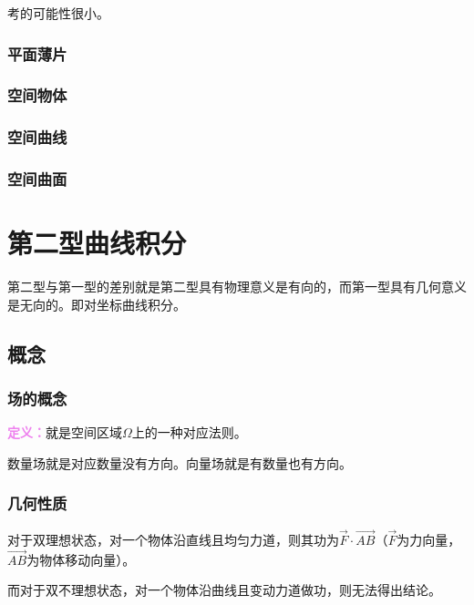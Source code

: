 \documentclass[UTF8, 12pt]{ctexart}
\begin{document}
        考的可能性很小。

        \subsubsection{平面薄片}

        \subsubsection{空间物体}

        \subsubsection{空间曲线}

        \subsubsection{空间曲面}

        \section{第二型曲线积分}

        第二型与第一型的差别就是第二型具有物理意义是有向的，而第一型具有几何意义是无向的。即对坐标曲线积分。

        \subsection{概念}

        \subsubsection{场的概念}

        \textcolor{violet}{\textbf{定义：}}就是空间区域$\Omega$上的一种对应法则。

        数量场就是对应数量没有方向。向量场就是有数量也有方向。

        \subsubsection{几何性质}

        对于双理想状态，对一个物体沿直线且均匀力道，则其功为$\vec{F}\cdot\overrightarrow{AB}$（$\vec{F}$为力向量，$\overrightarrow{AB}$为物体移动向量）。

        而对于双不理想状态，对一个物体沿曲线且变动力道做功，则无法得出结论。
\end{document}
